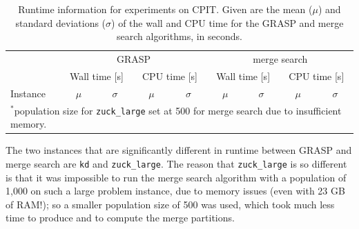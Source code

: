 \documentclass[authoryear,11pt,square,number,times,super,comma]{elsarticle}
\newcommand{\zucklarge}{\texttt{zuck\_large}}
\newcommand{\dmine}{\texttt{kd}}
\begin{document}
\begin{table}[h!]
\centering
\caption[Runtime information for experiments on CPIT]{Runtime information for experiments on CPIT. Given are the mean (\(\mu\)) and standard deviations (\(\sigma\)) of the wall and CPU time for the GRASP and merge search algorithms, in seconds.}\label{tab:mine:runtime}
\begin{adjustbox}{width=0.7\textwidth}
\begin{tabular}{lrrrrrrrr} \toprule
 & \multicolumn{4}{c}{GRASP} & \multicolumn{4}{c}{merge search}\\
\cmidrule(lr){2-5} \cmidrule(lr){6-9}
 & \multicolumn{2}{c}{Wall time [s]} & \multicolumn{2}{c}{CPU time [s]} & \multicolumn{2}{c}{Wall time [s]} & \multicolumn{2}{c}{CPU time [s]}\\
\cmidrule(lr){2-3}\cmidrule(lr){4-5} \cmidrule(lr){6-7}\cmidrule(lr){8-9}
Instance & \multicolumn{1}{c}{\(\mu\)}&\multicolumn{1}{c}{\(\sigma\)} & \multicolumn{1}{c}{\(\mu\)}& \multicolumn{1}{c}{\(\sigma\)}& \multicolumn{1}{c}{\(\mu\)}&\multicolumn{1}{c}{\(\sigma\)} & \multicolumn{1}{c}{\(\mu\)}& \multicolumn{1}{c}{\(\sigma\)}\\ \midrule



\bottomrule
\multicolumn{9}{l}{\(^*\)population size for \zucklarge{} set at 500 for merge search due to insufficient memory.}
\end{tabular}
\end{adjustbox}
\end{table}

The two instances that are significantly different in runtime between GRASP and merge search are \dmine{} and \zucklarge{}. The reason that \zucklarge{} is so different is that it was impossible to run the merge search algorithm with a population of 1,000 on such a large problem instance, due to memory issues (even with 23 GB of RAM!); so a smaller population size of 500 was used, which took much less time to produce and to compute the merge partitions.
\end{document}
